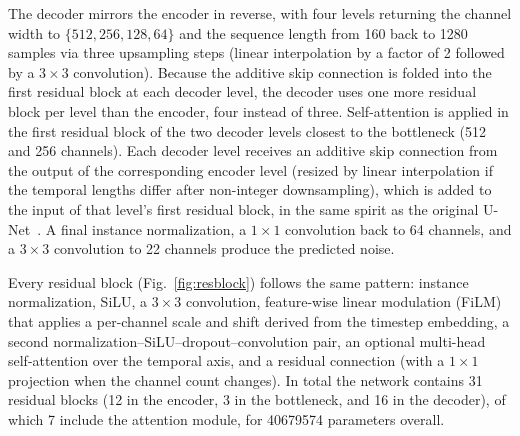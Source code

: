 \documentclass[journal]{IEEEtran}
\begin{document}
The decoder mirrors the encoder in reverse, with four levels returning the
channel width to $\{512,256,128,64\}$ and the sequence length from 160 back
to 1280 samples via three upsampling steps (linear interpolation by a factor
of 2 followed by a $3\times3$ convolution). Because the additive skip
connection is folded into the first residual block at each decoder level, the
decoder uses one more residual block per level than the encoder, four instead
of three. Self-attention is applied in the first residual block of the two
decoder levels closest to the bottleneck (512 and 256 channels). Each decoder
level receives an additive skip connection from the output of the
corresponding encoder level (resized by linear interpolation if the temporal
lengths differ after non-integer downsampling), which is added to the input
of that level's first residual block, in the same spirit as the original
U-Net~\cite{ronneberger2015unet}. A final instance normalization, a
$1\times1$ convolution back to 64 channels, and a $3\times3$ convolution to
22 channels produce the predicted noise.

Every residual block (Fig.~\ref{fig:resblock}) follows the same pattern:
instance normalization, SiLU, a $3\times3$ convolution, feature-wise linear
modulation (FiLM)~\cite{perez2018film} that applies a per-channel scale and
shift derived from the timestep embedding, a second
normalization--SiLU--dropout--convolution pair, an optional multi-head
self-attention over the temporal axis, and a residual connection (with a
$1\times1$ projection when the channel count changes). In total the network
contains 31 residual blocks (12 in the encoder, 3 in the bottleneck, and 16
in the decoder), of which 7 include the attention module, for
\num{40679574} parameters overall.
\end{document}
